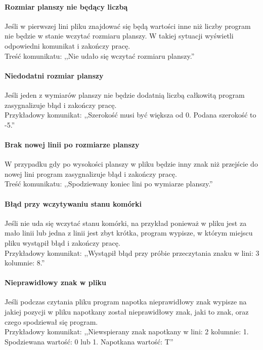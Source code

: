 \documentclass{report}
\begin{document}
\paragraph{Rozmiar planszy nie będący liczbą}
Jeśli w pierwszej lini pliku znajdować się będą wartości inne niż liczby program nie będzie w stanie wczytać rozmiaru planszy. W takiej sytuacji wyświetli odpowiedni komunikat i zakończy pracę. \\
 Treść komunikatu: ,,Nie udało się wczytać rozmiaru planszy.''
 
 \paragraph{Niedodatni rozmiar planszy}
 Jeśli jeden z wymiarów planszy nie będzie dodatnią liczbą całkowitą program zasygnalizuje błąd i zakończy pracę. \\
 Przykładowy komunikat: ,,Szerokość musi być większa od 0. Podana szerokość to -5.''
 
 \paragraph{Brak nowej linii po rozmiarze planszy}
 W przypadku gdy po wysokości planszy w pliku będzie inny znak niż przejście do nowej lini program zasygnalizuje błąd i zakończy pracę. \\
 Treść komunikatu: ,,Spodziewany koniec lini po wymiarze planszy.''
 
 \paragraph{Błąd przy wczytywaniu stanu komórki}
 Jeśli nie uda się wczytać stanu komórki, na przykład ponieważ w pliku jest za mało linii lub jedna z linii jest zbyt krótka, program wypisze, w którym miejscu pliku wystąpił błąd i zakończy pracę. \\
 Przykładowy komunikat: ,,Wystąpił błąd przy próbie przeczytania znaku w lini: 3 kolumnie: 8.''
 
 \paragraph{Nieprawidłowy znak w pliku}
 Jeśli podczas czytania pliku program napotka nieprawidłowy znak wypisze na jakiej pozycji w pliku napotkany został nieprawidłowy znak, jaki to znak, oraz czego spodziewał się program. \\
 Przykładowy komunikat: ,,Niewspierany znak napotkany w lini: 2 kolumnie: 1. Spodziewana wartość: 0 lub 1. Napotkana wartość: T''
\end{document}
